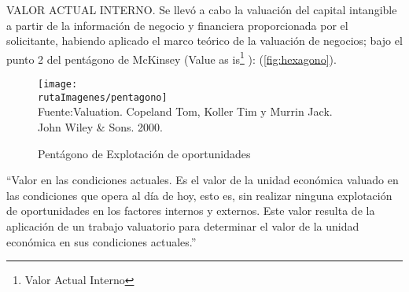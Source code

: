 \textcolor{secundario}{VALOR ACTUAL INTERNO.} Se llev\'o a cabo la valuaci\'on del capital intangible a partir de la informaci\'on de negocio y financiera proporcionada por el solicitante, habiendo aplicado el marco te\'orico de la valuaci\'on de negocios; bajo el punto 2 del pent\'agono de McKinsey (Value as is\footnote{Valor Actual Interno} ): (\textcolor{terciario}{\autoref{fig:hexagono}}).

\begin{figure}[H]
\centering
\caption{Pent\'agono de Explotaci\'on de oportunidades\label{fig:hexagono}}
\texttt{[image: \\rutaImagenes/pentagono]}\\
Fuente:Valuation. Copeland Tom, Koller Tim y Murrin Jack.\\

John Wiley \& Sons. 2000.
\end{figure}

``\textcolor{secundario}{Valor en las condiciones actuales.} Es el valor de la unidad econ\'omica valuado en las condiciones que opera al d\'ia de hoy, esto es, sin realizar ninguna explotaci\'on de oportunidades en los factores internos y externos. Este valor resulta de la aplicaci\'on de un trabajo valuatorio para determinar el valor de la unidad econ\'omica en sus condiciones actuales.''